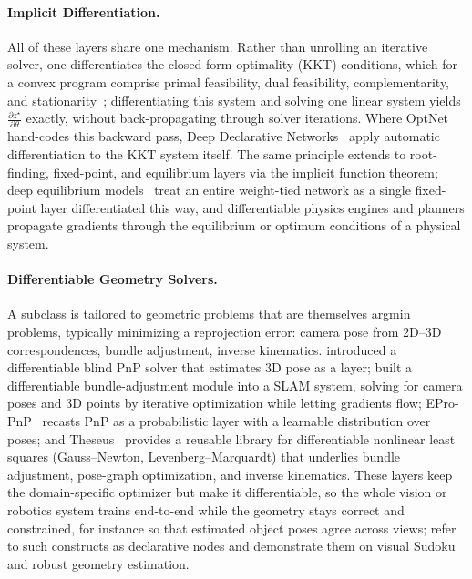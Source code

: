 \paragraph{Implicit Differentiation.}
All of these layers share one mechanism.
Rather than unrolling an iterative solver, one differentiates the closed-form optimality (KKT) conditions, which for a convex program comprise primal feasibility, dual feasibility, complementarity, and stationarity~\cite{DeepImplicitLayers}; differentiating this system and solving one linear system yields $\frac{\partial z^\star}{\partial \theta}$ exactly, without back-propagating through solver iterations.
Where OptNet hand-codes this backward pass, Deep Declarative Networks~\cite{gould2021deep} apply automatic differentiation to the KKT system itself.
The same principle extends to root-finding, fixed-point, and equilibrium layers via the implicit function theorem; deep equilibrium models~\cite{bai2019deep} treat an entire weight-tied network as a single fixed-point layer differentiated this way, and differentiable physics engines and planners propagate gradients through the equilibrium or optimum conditions of a physical system.

\paragraph{Differentiable Geometry Solvers.}
A subclass is tailored to geometric problems that are themselves argmin problems, typically minimizing a reprojection error: camera pose from 2D--3D correspondences, bundle adjustment, inverse kinematics.
\citet{campbell2020solving} introduced a differentiable blind PnP solver that estimates 3D pose as a layer; \citet{teed2021droid} built a differentiable bundle-adjustment module into a SLAM system, solving for camera poses and 3D points by iterative optimization while letting gradients flow; EPro-PnP~\cite{chen2022epro} recasts PnP as a probabilistic layer with a learnable distribution over poses; and Theseus~\cite{pineda2022theseus} provides a reusable library for differentiable nonlinear least squares (Gauss--Newton, Levenberg--Marquardt) that underlies bundle adjustment, pose-graph optimization, and inverse kinematics.
These layers keep the domain-specific optimizer but make it differentiable, so the whole vision or robotics system trains end-to-end while the geometry stays correct and constrained, for instance so that estimated object poses agree across views; \citet{gould2021deep} refer to such constructs as declarative nodes and demonstrate them on visual Sudoku and robust geometry estimation.

